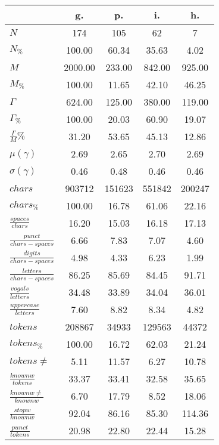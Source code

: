 \begin{table}[h!]
\begin{center}
\begin{tabular}{| l || c | c | c | c |}\hline
 & {\bf g.} & {\bf p.} & {\bf i.} & {\bf h.} \\\hline\hline
$N$ & 174  & 105  & 62  & 7 \\
$N_{\%}$ & 100.00  & 60.34  & 35.63  & 4.02 \\\hline
$M$ & 2000.00  & 233.00  & 842.00  & 925.00 \\
$M_{\%}$ & 100.00  & 11.65  & 42.10  & 46.25 \\\hline
$\Gamma$ & 624.00  & 125.00  & 380.00  & 119.00 \\
$\Gamma_{\%}$ & 100.00  & 20.03  & 60.90  & 19.07 \\\hline
$\frac{\Gamma}{M}\%$ & 31.20  & 53.65  & 45.13  & 12.86 \\
$\mu(\gamma)$ & 2.69  & 2.65  & 2.70  & 2.69 \\
$\sigma(\gamma)$ & 0.46  & 0.48  & 0.46  & 0.46 \\\hline\hline
$chars$ & 903712  & 151623  & 551842  & 200247 \\
$chars_{\%}$ & 100.00  & 16.78  & 61.06  & 22.16 \\\hline
$\frac{spaces}{chars}$ & 16.20  & 15.03  & 16.18  & 17.13 \\
$\frac{punct}{chars-spaces}$ & 6.66  & 7.83  & 7.07  & 4.60 \\
$\frac{digits}{chars-spaces}$ & 4.98  & 4.33  & 6.23  & 1.99 \\\hline
$\frac{letters}{chars-spaces}$ & 86.25  & 85.69  & 84.45  & 91.71 \\
$\frac{vogals}{letters}$ & 34.48  & 33.89  & 34.04  & 36.01 \\
$\frac{uppercase}{letters}$ & 7.60  & 8.82  & 8.34  & 4.82 \\\hline\hline
$tokens$ & 208867  & 34933  & 129563  & 44372 \\
$tokens_{\%}$ & 100.00  & 16.72  & 62.03  & 21.24 \\
$tokens \neq$ & 5.11  & 11.57  & 6.27  & 10.78 \\\hline
$\frac{knownw}{tokens}$ & 33.37  & 33.41  & 32.58  & 35.65 \\
$\frac{knownw \neq}{knownw}$ & 6.70  & 17.79  & 8.52  & 18.06 \\\hline
$\frac{stopw}{knownw}$ & 92.04  & 86.16  & 85.30  & 114.36 \\
$\frac{punct}{tokens}$ & 20.98  & 22.80  & 22.44  & 15.28 \\

\end{tabular}
\end{center}
\end{table}
